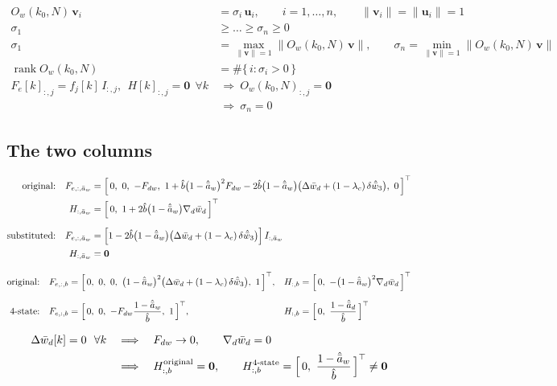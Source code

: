 \documentclass[11pt,a4paper,fontset=none]{ctexart}
\newcommand{\ba}{\bar{a}}
\newcommand{\bw}{\bar{w}}
\newcommand{\ah}{\hat{\ba}_w}
\newcommand{\bh}{\hat{b}}
\newcommand{\ad}{\hat{\ba}_d}
\begin{document}
\begin{align*}
O_w(k_0,N)\,\mathbf{v}_i &= \sigma_i\,\mathbf{u}_i, \qquad i = 1,\dots,n, \qquad
\|\mathbf{v}_i\| = \|\mathbf{u}_i\| = 1 \\
\sigma_1 &\ge \dots \ge \sigma_n \ge 0 \\
\sigma_1 &= \max_{\|\mathbf{v}\|=1}\|O_w(k_0,N)\,\mathbf{v}\|, \qquad
\sigma_n = \min_{\|\mathbf{v}\|=1}\|O_w(k_0,N)\,\mathbf{v}\| \\
\operatorname{rank} O_w(k_0,N) &= \#\{\,i : \sigma_i > 0\,\} \\
F_e[k]_{:,j} = f_j[k]\,I_{:,j},\ \ H[k]_{:,j} = \mathbf{0}\ \ \forall k
  &\ \Rightarrow\ O_w(k_0,N)_{:,j} = \mathbf{0} \\
  &\ \Rightarrow\ \sigma_n = 0
\end{align*}

\subsection*{The two columns}

\begin{align*}
\text{original:}\quad
F_{e,:,\ba_w} &= \Bigl[\,0,\ 0,\ -F_{dw},\
  1 + \bh\bigl(1-\ah\bigr)^{2}F_{dw} - 2\bh\bigl(1-\ah\bigr)\bigl(\Delta\bw_d + (1-\lambda_c)\,\delta\hat{\bw}_3\bigr),\ 0\,\Bigr]^{\top} \\
H_{:,\ba_w} &= \Bigl[\,0,\ 1 + 2\bh\bigl(1-\ah\bigr)\nabla_d\bw_d\,\Bigr]^{\top} \\[6pt]
\text{substituted:}\quad
F_{e,:,\ba_w} &= \Bigl[1 - 2\bh\bigl(1-\ah\bigr)\bigl(\Delta\bw_d + (1-\lambda_c)\,\delta\hat{\bw}_3\bigr)\Bigr]\,I_{:,\ba_w} \\
H_{:,\ba_w} &= \mathbf{0}
\end{align*}

\begin{align*}
\text{original:}\quad
F_{e,:,b} &= \Bigl[\,0,\ 0,\ 0,\ \bigl(1-\ah\bigr)^{2}\bigl(\Delta\bw_d + (1-\lambda_c)\,\delta\hat{\bw}_3\bigr),\ 1\,\Bigr]^{\top}, &
H_{:,b} &= \Bigl[\,0,\ -\bigl(1-\ah\bigr)^{2}\nabla_d\bw_d\,\Bigr]^{\top} \\[6pt]
\text{4-state:}\quad
F_{e,:,b} &= \Bigl[\,0,\ 0,\ -F_{dw}\dfrac{1-\ah}{\bh},\ 1\,\Bigr]^{\top}, &
H_{:,b} &= \Bigl[\,0,\ \dfrac{1-\ad}{\bh}\,\Bigr]^{\top}
\end{align*}

\begin{align*}
\Delta\bw_d[k] = 0\ \ \forall k \quad&\Longrightarrow\quad F_{dw} \to 0, \qquad \nabla_d\bw_d = 0 \\
&\Longrightarrow\quad H^{\text{original}}_{:,b} = \mathbf{0}, \qquad
H^{\text{4-state}}_{:,b} = \Bigl[\,0,\ \frac{1-\ah}{\bh}\,\Bigr]^{\top} \neq \mathbf{0}
\end{align*}
\end{document}
